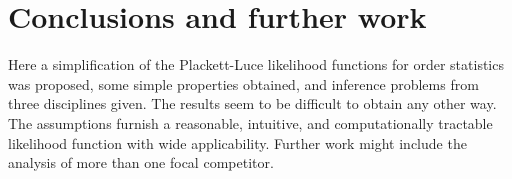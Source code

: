 \documentclass[ejs,noshowframe]{imsart}
\theoremstyle{plain}
\theoremstyle{definition}
\theoremstyle{remark}
\begin{document}
\section{Conclusions and further work}

Here a simplification of the Plackett-Luce likelihood functions for
order statistics was proposed, some simple properties obtained, and
inference problems from three disciplines given.  The results seem to
be difficult to obtain any other way.  The assumptions furnish a
reasonable, intuitive, and computationally tractable likelihood
function with wide applicability.  Further work might include the
analysis of more than one focal competitor.



\begin{supplement}
\end{supplement}


\end{document}

